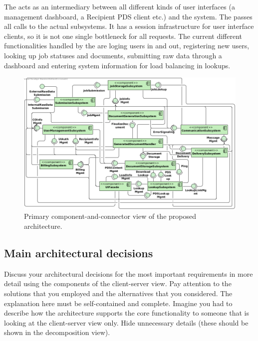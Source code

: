 The  acts as an intermediary between all different kinds of user interfaces (a management dashboard, a Recipient PDS client etc.) and the system. The  passes all calls to the actual subsystems. It has a session infrastructure for user interface clients, so it is not one single bottleneck for all requests. The current different functionalities handled by the  are loging users in and out, registering new users, looking up job statuses and documents, submitting raw data through a dashboard and entering system information for load balancing in lookups.\\

\begin{figure}[!htp]
    \centering
    \includegraphics[width=\textwidth]{figures/Subsystem Diagram.png}
    \caption{Primary component-and-connector view of the proposed architecture.}\label{fig:cs-primary}
\end{figure}

\subsection{Main architectural decisions}
Discuss your architectural decisions for the most important requirements in
more detail using the components of the client-server view.
Pay attention to the solutions that you employed and the alternatives that you
considered.
The explanation here must be self-contained and complete.
Imagine you had to describe how the architecture supports the core
functionality to someone that is looking at the client-server view only.
Hide unnecessary details (these should be shown in the decomposition view).

